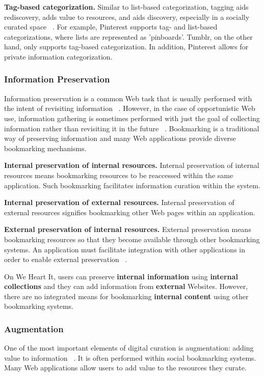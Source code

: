 \documentclass{casconpaper}
\begin{document}
{{\textbf{Tag-based categorization.} Similar to list-based categorization, tagging aids rediscovery, adds value to resources, and aids discovery, especially in a socially curated space ~\cite{gruber}.  For example, Pinterest supports tag- and list-based categorizations, where lists are represented as 'pinboards'. Tumblr, on the other hand, only supports tag-based categorization. In addition, Pinterest allows for private information categorization.

} %

{\subsubsection{Information Preservation}
Information preservation is a common Web task that is usually performed with the intent of revisiting information ~\cite{abrams, wittaker}. However, in the case of opportunistic Web use, information gathering is sometimes performed with just the goal of collecting information rather than revisiting it in the future ~\cite{lindley}. Bookmarking is a traditional way of preserving information and many Web applications provide diverse bookmarking mechanisms. 

\textbf{Internal preservation of internal resources.} Internal preservation of internal resources means bookmarking resources to be reaccessed within the same application. Such bookmarking facilitates information curation within the system.

\textbf{Internal preservation of external resources.} Internal preservation of external resources signifies bookmarking other Web pages within an application. 
  
\textbf{External preservation of internal resources.} External preservation means bookmarking resources so that they become available through other bookmarking systems. An application must facilitate integration with other applications in order to enable external preservation ~\cite{abrams}.

On We Heart It, users can preserve \textbf{internal  information} using \textbf{internal collections} and they can add information from \textbf{external} Websites. However, there are no integrated means for bookmarking \textbf{internal content} using other bookmarking systems.  

} %

{\subsubsection{Augmentation}
One of the most important elements of digital curation is augmentation: adding value to information ~\cite{beagrie, wittaker}. It is often performed within social bookmarking systems. Many Web applications allow users to add value to the resources they curate. 

}}
\end{document}

